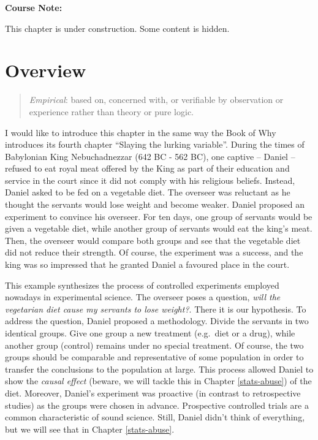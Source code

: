 \documentclass[
]{book}
\begin{document}
\begin{notebox}

\begin{center}
\textbf{Course Note:}

\end{center}

This chapter is under construction. Some content is hidden.

\end{notebox}

\hypertarget{overview-1}{%
\section{Overview}\label{overview-1}}

\begin{quote}
\emph{Empirical}: based on, concerned with, or verifiable by observation or experience rather than theory or pure logic.
\end{quote}

I would like to introduce this chapter in the same way the Book of Why \citep{book-of-why} introduces its fourth chapter ``Slaying the lurking variable''. During the times of Babylonian King Nebuchadnezzar (642 BC - 562 BC), one captive -- Daniel -- refused to eat royal meat offered by the King as part of their education and service in the court since it did not comply with his religious beliefs. Instead, Daniel asked to be fed on a vegetable diet. The overseer was reluctant as he thought the servants would lose weight and become weaker. Daniel proposed an experiment to convince his overseer. For ten days, one group of servants would be given a vegetable diet, while another group of servants would eat the king's meat. Then, the overseer would compare both groups and see that the vegetable diet did not reduce their strength. Of course, the experiment was a success, and the king was so impressed that he granted Daniel a favoured place in the court.

This example synthesizes the process of controlled experiments employed nowadays in experimental science. The overseer poses a question, \emph{will the vegetarian diet cause my servants to lose weight?}. There it is our hypothesis. To address the question, Daniel proposed a methodology. Divide the servants in two identical groups. Give one group a new treatment (e.g.~diet or a drug), while another group (control) remains under no special treatment. Of course, the two groups should be comparable and representative of some population in order to transfer the conclusions to the population at large. This process allowed Daniel to show the \emph{causal effect} (beware, we will tackle this in Chapter \ref{stats-abuse}) of the diet. Moreover, Daniel's experiment was proactive (in contrast to retrospective studies) as the groups were chosen in advance. Prospective controlled trials are a common characteristic of sound science. Still, Daniel didn't think of everything, but we will see that in Chapter \ref{stats-abuse}.
\end{document}
